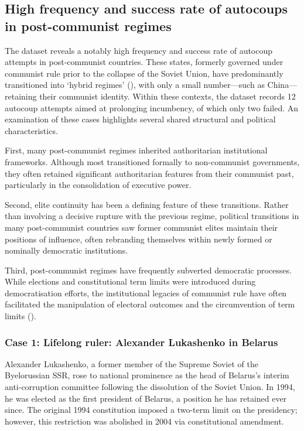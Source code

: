 \documentclass[
  12pt,
]{report}
\begin{document}
\subsection{High frequency and success rate of autocoups in
post-communist
regimes}\label{high-frequency-and-success-rate-of-autocoups-in-post-communist-regimes}

The dataset reveals a notably high frequency and success rate of
autocoup attempts in post-communist countries. These states, formerly
governed under communist rule prior to the collapse of the Soviet Union,
have predominantly transitioned into `hybrid regimes'
(), with only a
small number---such as China---retaining their communist identity.
Within these contexts, the dataset records 12 autocoup attempts aimed at
prolonging incumbency, of which only two failed. An examination of these
cases highlights several shared structural and political
characteristics.

First, many post-communist regimes inherited authoritarian institutional
frameworks. Although most transitioned formally to non-communist
governments, they often retained significant authoritarian features from
their communist past, particularly in the consolidation of executive
power.

Second, elite continuity has been a defining feature of these
transitions. Rather than involving a decisive rupture with the previous
regime, political transitions in many post-communist countries saw
former communist elites maintain their positions of influence, often
rebranding themselves within newly formed or nominally democratic
institutions.

Third, post-communist regimes have frequently subverted democratic
processes. While elections and constitutional term limits were
introduced during democratisation efforts, the institutional legacies of
communist rule have often facilitated the manipulation of electoral
outcomes and the circumvention of term limits
().

\subsubsection*{Case 1: Lifelong ruler: Alexander Lukashenko in
Belarus}\label{case-1-lifelong-ruler-alexander-lukashenko-in-belarus}

Alexander Lukashenko, a former member of the Supreme Soviet of the
Byelorussian SSR, rose to national prominence as the head of Belarus's
interim anti-corruption committee following the dissolution of the
Soviet Union. In 1994, he was elected as the first president of Belarus,
a position he has retained ever since. The original 1994 constitution
imposed a two-term limit on the presidency; however, this restriction
was abolished in 2004 via constitutional amendment.
\end{document}
